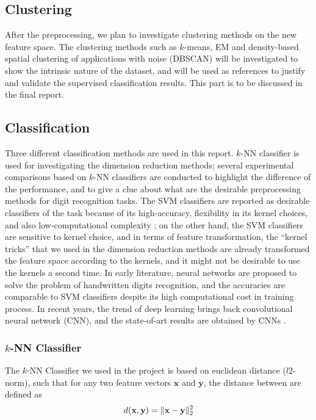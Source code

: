 \documentclass[12pt]{article}
\begin{document}
 
\subsection{Clustering}
After the preprocessing, we plan to investigate clustering methods on the new feature space. The clustering methods such as $k$-means, EM and density-based spatial clustering of applications with noise (DBSCAN) will be investigated to show the intrinsic nature of the dataset, and will be used as references to justify and validate the supervised classification results. This part is to be discussed in the final report.

\subsection{Classification}
Three different classification methods are used in this report. $k$-NN\cite{altman1992introduction} classifier is used for investigating the dimension reduction methods; several experimental comparisons based on $k$-NN classifiers are conducted to highlight the difference of the performance, and to give a clue about what are the desirable preprocessing methods for digit recognition tasks. The SVM classifiers are reported as desirable classifiers of the task because of its high-accuracy, flexibility in its kernel choices, and also low-computational complexity \cite{soltanzadeh2004recognition, bottou1994comparison, liu2003handwritten}; on the other hand, the SVM classifiers are sensitive to kernel choice, and in terms of feature transformation, the ``kernel tricks'' that we used in the dimension reduction methods are already transformed the feature space according to the kernels, and it might not be desirable to use the kernels a second time. In early literature, neural networks are proposed to solve the problem of handwritten digits recognition, and the accuracies are comparable to SVM classifiers \cite{le1990handwritten, lecun1995comparison} despite its high computational cost in training process. In recent years, the trend of deep learning brings back convolutional neural network (CNN), and the state-of-art results are obtained by CNNs \cite{krizhevsky2012imagenet,cirecsan2011convolutional, ciresan2012multi}.

\subsubsection{$k$-NN Classifier}

The $k$-NN\cite{altman1992introduction} Classifier we used in the project is based on euclidean distance ($l2$-norm), such that for any two feature vectors $\mathbf{x}$ and $\mathbf{y}$, the distance between are defined as
\begin{equation}
	d({\bf x}, {\bf y}) = \|{\bf x} - {\bf y}\|_2^2
\end{equation}
\end{document}
